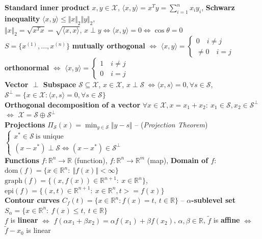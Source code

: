 \documentclass[a4paper]{article}
\begin{document}
\textbf{Standard inner product} $x, y \in \mathcal{X}$, $\langle x, y \rangle = x^T{y}=\sum_{i=1}^n{x_i y_i}$, \textbf{Schwarz inequality} $\langle x, y \rangle \le \Vert{x}\Vert_2 \Vert{y}\Vert_2$,\\
 $\Vert x \Vert_2 = \sqrt{x^T x} = \sqrt{\langle x,x \rangle}$, $x \perp y \iff \langle x,y \rangle=0 \iff \cos\theta=0$\\
 $S=\{x^{(1)}, ..., x^{(n)}\}$ \textbf{mutually orthogonal} $\iff$ $\langle{x,y}\rangle = \begin{cases}
    0 \quad i{\ne}j\\
    \ne 0 \quad i= j
 \end{cases}$ \textbf{orthonormal} $\iff$ $\langle{x,y}\rangle = \begin{cases}
    1 \quad i{\ne}j\\
     0 \quad i= j
 \end{cases}$\\
\textbf{Vector $\perp$ Subspace} $\mathcal{S}\subseteq\mathcal{X}$, $x\in\mathcal{X}$, $x\perp\mathcal{S} \ \iff \langle{x,s}\rangle=0, \forall{s}\in\mathcal{S}$, $\mathcal{S}^{\perp}=\{x\in\mathcal{X}: \langle{x,s}\rangle=0, \forall{s}\in\mathcal{S}\}$\\
 \textbf{Orthogonal decomposition of a vector} $\forall{x}\in\mathcal{X}, x=x_1+x_2: \ x_1 \in \mathcal{S}, x_2 \in \mathcal{S}^{\perp}$ $\iff$ $\mathcal{X} = \mathcal{S} \oplus \mathcal{S}^{\perp}$\\
\textbf{Projections} $\Pi_{\mathcal{S}}(x)=\min_{y\in\mathcal{S}} \Vert y-s \Vert$ -- (\textit{\textsf{Projection Theorem}})
$
\begin{cases}
    x^*\in\mathcal{S} \ \text{is unique} \\
    (x-x^*) \perp \mathcal{S} \iff (x-x^*) \in \mathcal{S}^{\perp}
\end{cases}
$\\
\textbf{Functions}  $f:\mathbb{R}^n \to \mathbb{R}$ (function), $f: \mathbb{R}^n \to \mathbb{R}^m$ (map), \textbf{Domain of $f$}: $\text{dom}(f)=\{x\in\mathbb{R}^n: \ \Vert f(x) \Vert < \infty \}$\\
$\text{graph}(f)=\{(x,f(x))\in\mathbb{R}^{n+1}: \ x\in \mathbb{R}^n\}$, $\text{epi}(f)=\{(x,t)\in\mathbb{R}^{n+1}: \ x\in\mathbb{R}^n,t>=f(x)\}$\\
\textbf{Contour curves} $C_f(t)=\{x\in \mathbb{R}^n: f(x)=t, \  t\in\mathbb{R}\}$ -- \textbf{$\alpha$-sublevel set} $S_{\alpha}=\{x\in\mathbb{R}^n: \ f(x)\le t, \ t\in \mathbb{R}\}$       \\
$f$ is \textbf{linear} $\iff$ $f(\alpha x_1 + \beta x_2) = \alpha f(x_1) + \beta f(x_2)$, $\alpha, \beta \in \mathbb{R}$, $\tilde{f}$ is \textbf{affine} $\iff$ $\tilde{f}-x_0$ is linear\\
\end{document}
